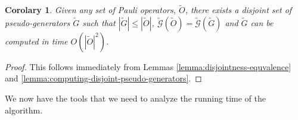 \documentclass[twocolumn,showpacs,preprintnumbers,amsmath,amssymb,nofootinbib,pra,floatfix]{revtex4-1}
\newtheorem{corolary}{Corolary}
\newenvironment{remark}[1][Remark]{\begin{trivlist}
\item[\hskip \labelsep {\bfseries #1}]}{\end{trivlist}}
\newcommand{\set}{\tilde}
\newcommand{\genfun}{\tilde{\mathcal{G}}}
\begin{document}
\begin{corolary}
\label{corolary:computing-disjoint-pseudo-generators}
Given any set of Pauli operators, $\set O$, there exists a disjoint set of pseudo-generators $\set G$ such that $|\set G|\le|\set O|$, $\genfun(\set O)=\genfun(\set G)$ and $\set G$ can be computed in time $O(|\set O|^2)$.
\end{corolary}

\begin{proof}
This follows immediately from Lemmas \ref{lemma:disjointness-equvalence} and \ref{lemma:computing-disjoint-pseudo-generators}.
\end{proof}
\begin{remark}
We now have the tools that we need to analyze the running time of the algorithm.
\end{remark}
\end{document}
